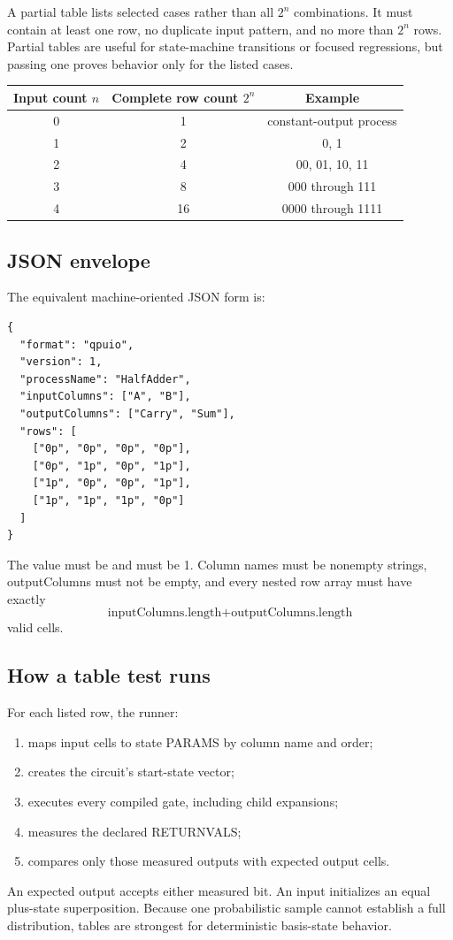 A partial table lists selected cases rather than all $2^n$ combinations. It
must contain at least one row, no duplicate input pattern, and no more than
$2^n$ rows. Partial tables are useful for state-machine transitions or focused
regressions, but passing one proves behavior only for the listed cases.

\begin{center}
\begin{tabular}{c|c|c}\toprule
Input count $n$ & Complete row count $2^n$ & Example\\\midrule
0&1&constant-output process\\
1&2&0, 1\\
2&4&00, 01, 10, 11\\
3&8&000 through 111\\
4&16&0000 through 1111\\\bottomrule
\end{tabular}
\end{center}

\subsection{JSON  envelope}

The equivalent machine-oriented JSON form is:
\begin{lstlisting}[language={}]
{
  "format": "qpuio",
  "version": 1,
  "processName": "HalfAdder",
  "inputColumns": ["A", "B"],
  "outputColumns": ["Carry", "Sum"],
  "rows": [
    ["0p", "0p", "0p", "0p"],
    ["0p", "1p", "0p", "1p"],
    ["1p", "0p", "0p", "1p"],
    ["1p", "1p", "1p", "0p"]
  ]
}
\end{lstlisting}

The  value must be  and  must be 1.
Column names must be nonempty strings, outputColumns must not be empty, and
every nested row array must have exactly
\[
\text{inputColumns.length}+\text{outputColumns.length}
\]
valid cells.

\subsection{How a table test runs}

For each listed row, the runner:
\begin{enumerate}
  \item maps input cells to state PARAMS by column name and order;
  \item creates the circuit's start-state vector;
  \item executes every compiled gate, including child expansions;
  \item measures the declared RETURNVALS;
  \item compares only those measured outputs with expected output cells.
\end{enumerate}
An expected output  accepts either measured bit. An input 
initializes an equal plus-state superposition. Because one probabilistic sample
cannot establish a full distribution, tables are strongest for deterministic
basis-state behavior.

